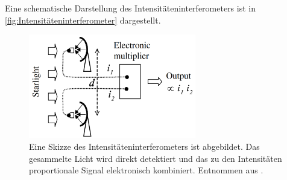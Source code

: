 Eine schematische Darstellung des Intensitäteninterferometers ist in \autoref{fig:Intensitäteninterferometer} dargestellt. 
\begin{figure}[h]
    \centering
    \includegraphics[width=0.65\textwidth]{images/Theorie/Fox_6.1b.png}
    \caption{Eine Skizze des Intensitäteninterferometers ist abgebildet. Das gesammelte Licht wird direkt detektiert und das zu den Intensitäten proportionale Signal elektronisch kombiniert. Entnommen aus \cite[Fig. 6.1(b)]{foxQuantumOpticsIntroduction2006}.}
    \label{fig:Intensitäteninterferometer}
\end{figure}

